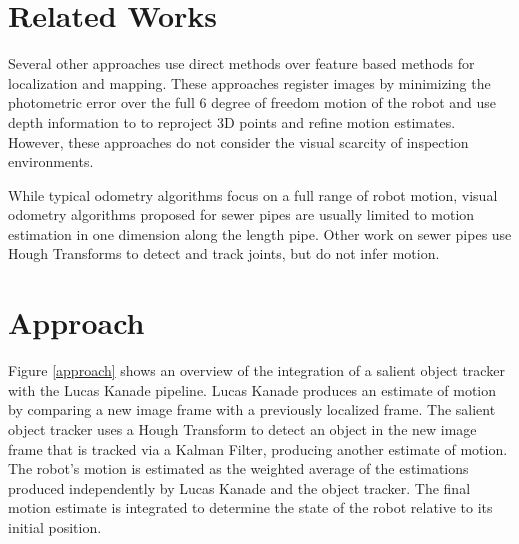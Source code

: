 \documentclass[letterpaper, 10 pt, conference]{ieeeconf}
\begin{document}
\section{Related Works}

Several other approaches \cite{Scaramuzza14, Kerl13, Comport10, Tykkala11} use direct methods over feature based methods for localization and mapping. These approaches register images by minimizing the photometric error over the full 6 degree of freedom motion of the robot and use depth information to to reproject 3D points and refine motion estimates. However, these approaches do not consider the visual scarcity of inspection environments.



While typical odometry algorithms focus on a full range of robot motion, visual odometry algorithms proposed for sewer pipes \cite{Saenz08, Browning11} are usually limited to motion estimation in one dimension along the length pipe. Other work on sewer pipes \cite{Pan94, Pan95} use Hough Transforms to detect and track joints, but do not infer motion.

\section{Approach}

Figure \ref{approach} shows an overview of the integration of a salient object tracker with the Lucas Kanade pipeline. Lucas Kanade produces an estimate of motion by comparing a new image frame with a previously localized frame. The salient object tracker uses a Hough Transform to detect an object in the new image frame that is tracked via a Kalman Filter, producing another estimate of motion. The robot's motion is estimated as the weighted average of the estimations produced independently by Lucas Kanade and the object tracker. The final motion estimate is integrated to determine the state of the robot relative to its initial position.
\end{document}
